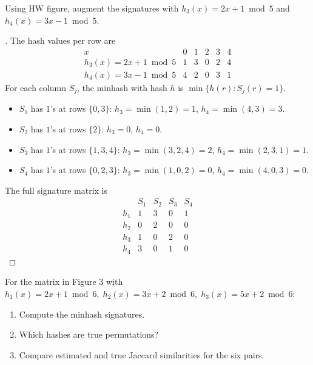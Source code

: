 \documentclass[en,hazy,blue,12pt,normal]{../../elegantnote}
\begin{document}
\begin{homework}
Using HW figure, augment the signatures with $h_3(x)=2x+1\bmod 5$ and $h_4(x)=3x-1\bmod 5$.
\end{homework}

\begin{proof}[\solutionname]

The hash values per row are
\[
\begin{array}{c|ccccc}
x & 0 & 1 & 2 & 3 & 4\\\hline
h_3(x)=2x+1\bmod 5 & 1 & 3 & 0 & 2 & 4\\
h_4(x)=3x-1\bmod 5 & 4 & 2 & 0 & 3 & 1
\end{array}
\]
For each column $S_j$, the minhash with hash $h$ is $\min\{h(r):S_j(r)=1\}$.

\begin{itemize}
    \item $S_1$ has $1$'s at rows $\{0,3\}$: $h_3=\min(1,2)=1$, $h_4=\min(4,3)=3$.
    \item $S_2$ has $1$'s at rows $\{2\}$: $h_3=0$, $h_4=0$.
    \item $S_3$ has $1$'s at rows $\{1,3,4\}$: $h_3=\min(3,2,4)=2$, $h_4=\min(2,3,1)=1$.
    \item $S_4$ has $1$'s at rows $\{0,2,3\}$: $h_3=\min(1,0,2)=0$, $h_4=\min(4,0,3)=0$.
\end{itemize}

The full signature matrix is
\[
\begin{array}{c|cccc}
 & S_1 & S_2 & S_3 & S_4\\\hline
h_1 & 1 & 3 & 0 & 1\\
h_2 & 0 & 2 & 0 & 0\\
h_3 & 1 & 0 & 2 & 0\\
h_4 & 3 & 0 & 1 & 0
\end{array}
\]
\end{proof}

\begin{homework}
 For the matrix in Figure 3 with $h_1(x)=2x+1\bmod 6,\;h_2(x)=3x+2\bmod 6,\;h_3(x)=5x+2\bmod 6$:
\begin{enumerate}
    \item[(a)] Compute the minhash signatures.
    \item[(b)] Which hashes are true permutations?
    \item[(c)] Compare estimated and true Jaccard similarities for the six pairs.
\end{enumerate}
\end{homework}
\end{document}
